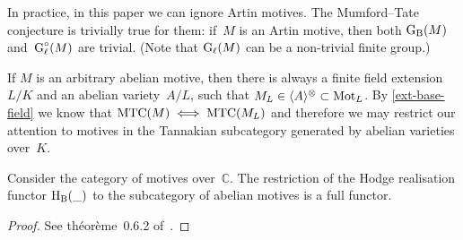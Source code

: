 \documentclass[10pt,twoside,leqno]{article}
\numberwithin{equation}{subsection}
\newcommand{\onto}{\twoheadrightarrow}
\newcommand{\End}{\textnormal{End}}
\newcommand{\QQ}{\mathbb{Q}}
\newcommand{\QQl}{\QQ_{\ell}}
\newcommand{\CC}{\mathbb{C}}
\newcommand{\Vect}{\textnormal{Vect}}
\newcommand{\HH}{\textnormal{H}}
\newcommand{\Hl}{\HH_{\ell}}
\newcommand{\HB}{\HH_{\textnormal{B}}}
\newcommand{\Mot}{\textnormal{Mot}}
\newcommand{\Zentrum}{\textnormal{Z}}
\newcommand{\GG}{\textnormal{G}}
\newcommand{\GB}{\GG_{\textnormal{B}}}
\newcommand{\Gl}{\GG_{\ell}}
\newcommand{\Glc}{\Gl^{\circ}}
\newcommand{\Tangen}[1]{\langle #1 \rangle^{\otimes}}
\newcommand{\MTC}{\textnormal{MTC}}
\begin{document}
\begin{remark} %
 \label{ignore-Artin-motives}
 In practice, in this paper we can ignore Artin motives.
 The Mumford--Tate conjecture is trivially true for them:
 if~$M$ is an Artin motive, then both $\GB(M)$ and~$\Glc(M)$ are trivial.
 (Note that $\Gl(M)$ can be a non-trivial finite group.)

 If $M$ is an arbitrary abelian motive,
 then there is always a finite field extension~$L/K$
 and an abelian variety~$A/L$, such that $M_L \in \Tangen{A} \subset \Mot_L$.
 By \cref{ext-base-field} we know that $\MTC(M) \iff \MTC(M_L)$
 and therefore we may restrict our attention to
 motives in the Tannakian subcategory generated by abelian varieties over~$K$.
\end{remark}

\begin{theorem} %
 \label{hodge-is-motivated}
	Consider the category of motives over~$\CC$.
 The restriction of the Hodge realisation functor $\HB(\_)$
 to the subcategory of abelian motives is a full functor.
 \begin{proof}
  See th\'eor\`eme~0.6.2 of~\cite{An95}.
 \end{proof}
\end{theorem}

\begin{remark} %
\end{remark}
\end{document}
